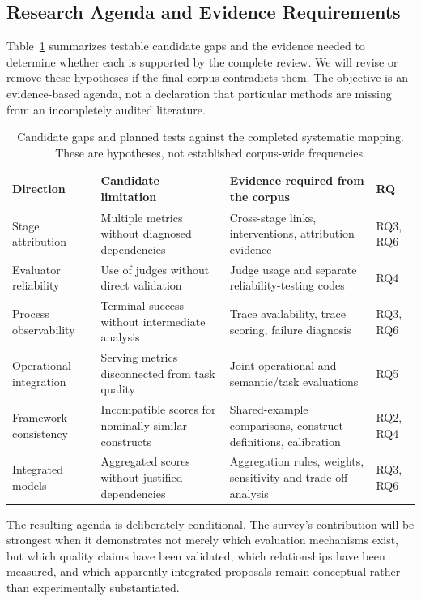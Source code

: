\subsection{Research Agenda and Evidence Requirements}

Table~\ref{tab:gaps-agenda} summarizes testable candidate gaps and the evidence needed to determine whether each is supported by the complete review. We will revise or remove these hypotheses if the final corpus contradicts them. The objective is an evidence-based agenda, not a declaration that particular methods are missing from an incompletely audited literature.

\begin{table}[t]
\centering
\footnotesize
\caption{Candidate gaps and planned tests against the completed systematic mapping. These are hypotheses, not established corpus-wide frequencies.}
\label{tab:gaps-agenda}
\begin{tabular}{p{} p{} p{} p{}}
\toprule
\textbf{Direction} & \textbf{Candidate limitation} & \textbf{Evidence required from the corpus} & \textbf{RQ} \\
\midrule
Stage attribution & Multiple metrics without diagnosed dependencies & Cross-stage links, interventions, attribution evidence & RQ3, RQ6 \\
Evaluator reliability & Use of judges without direct validation & Judge usage and separate reliability-testing codes & RQ4 \\
Process observability & Terminal success without intermediate analysis & Trace availability, trace scoring, failure diagnosis & RQ3, RQ6 \\
Operational integration & Serving metrics disconnected from task quality & Joint operational and semantic/task evaluations & RQ5 \\
Framework consistency & Incompatible scores for nominally similar constructs & Shared-example comparisons, construct definitions, calibration & RQ2, RQ4 \\
Integrated models & Aggregated scores without justified dependencies & Aggregation rules, weights, sensitivity and trade-off analysis & RQ3, RQ6 \\
\bottomrule
\end{tabular}
\end{table}

The resulting agenda is deliberately conditional. The survey's contribution will be strongest when it demonstrates not merely which evaluation mechanisms exist, but which quality claims have been validated, which relationships have been measured, and which apparently integrated proposals remain conceptual rather than experimentally substantiated.
